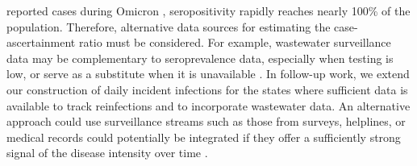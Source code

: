 reported cases during Omicron \citep{ruff2022rapid, nyreinfect2021,
hireinfect2022, wareinfect2022}, seropositivity rapidly reaches nearly 100\% of
the population. Therefore, alternative data sources for estimating the
case-ascertainment ratio must be considered. For example, wastewater
surveillance data may be complementary to seroprevalence data, especially when
testing is low, or serve as a substitute when it is unavailable
\citep{mcmanus2023predicting}. In follow-up work, we extend our
construction of daily incident infections for the states where sufficient data
is available to track reinfections and to incorporate wastewater data.
An alternative approach could use surveillance streams such as those from
surveys, helplines, or medical records could potentially be integrated if they
offer a sufficiently strong signal of the disease intensity over time
\citep{reinhart2021open,ecdc2020strategies}.



